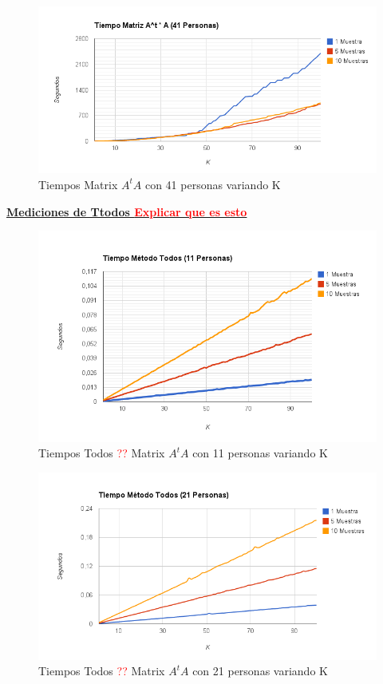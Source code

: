 \begin{figure}[H]
\includegraphics[width=1\textwidth]{img/image3.png}
     \caption{Tiempos Matrix $A^tA$ con 41 personas variando K}
     \label{fig:figura1}
\end{figure}


\underline{\textbf{Mediciones de Ttodos \textcolor{red}{Explicar que es esto}}}

\begin{figure}[H]
\includegraphics[width=1\textwidth]{img/image4.png}
     \caption{Tiempos Todos \textcolor{red}{??} Matrix $A^tA$ con 11 personas variando K}
     \label{fig:figura1}
\end{figure}

\begin{figure}[H]
\includegraphics[width=1\textwidth]{img/image5.png}
     \caption{Tiempos Todos \textcolor{red}{??} Matrix $A^tA$ con 21 personas variando K}
     \label{fig:figura1}
\end{figure}

